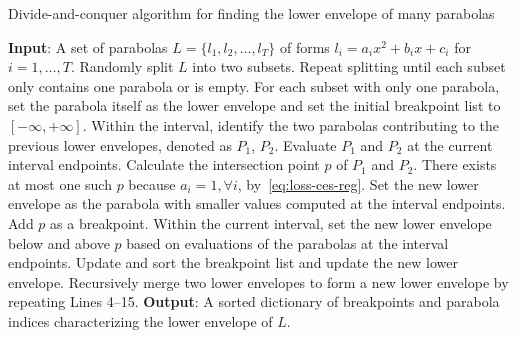 \begin{algorithm}[H]
    \caption{Divide-and-conquer algorithm for finding the lower envelope of many parabolas}
    \label{alg:envelope}
    \begin{algorithmic} [1]
        \STATE \textbf{Input}: A set of parabolas $L = \{l_1, l_2, \dots, l_T \}$ of forms $l_i = a_i x^2 + b_i x + c_i$ for $i=1,\dots, T$.
        \STATE Randomly split $L$ into two subsets. Repeat splitting until each subset only contains one parabola or is empty.
        \STATE For each subset with only one parabola, set the parabola itself as the lower envelope and set the initial breakpoint list to $[-\infty, +\infty]$.
            \STATE Within the interval, identify the two parabolas contributing to the previous lower envelopes, denoted as $P_1$, $P_2$.
            \STATE Evaluate $P_1$ and $P_2$ at the current interval endpoints.
            \STATE Calculate the intersection point $p$ of $P_1$ and $P_2$. There exists at most one such $p$ because $a_i = 1, \forall i$, by~\eqref{eq:loss-ces-reg}.
            \STATE Set the new lower envelope as the parabola with smaller values computed at the interval endpoints.
            \ELSE \STATE Add $p$ as a breakpoint.
            \STATE Within the current interval, set the new lower envelope below and above $p$ based on evaluations of the parabolas at the interval endpoints.
            \ENDIF
            \STATE Update and sort the breakpoint list and update the new lower envelope.
        \ENDFOR
        \STATE Recursively merge two lower envelopes to form a new lower envelope by repeating Lines 4--15.
        \STATE \textbf{Output}: A sorted dictionary of breakpoints and parabola indices characterizing the lower envelope of $L$.
\end{algorithmic}
\end{algorithm}


